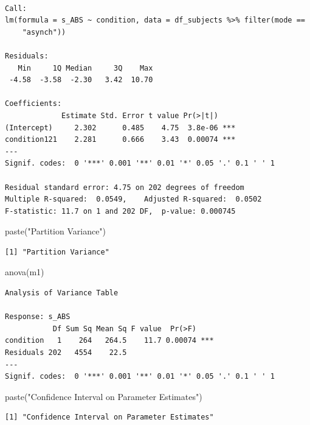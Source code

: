 \documentclass[
  letterpaper,
  DIV=11,
  numbers=noendperiod]{scrreprt}
\newenvironment{Shaded}{\begin{snugshade}}{\end{snugshade}}
\newcommand{\FunctionTok}[1]{\textcolor[rgb]{0.28,0.35,0.67}{#1}}
\newcommand{\NormalTok}[1]{\textcolor[rgb]{0.00,0.23,0.31}{#1}}
\newcommand{\StringTok}[1]{\textcolor[rgb]{0.13,0.47,0.30}{#1}}
\begin{document}
\begin{verbatim}

Call:
lm(formula = s_ABS ~ condition, data = df_subjects %>% filter(mode == 
    "asynch"))

Residuals:
   Min     1Q Median     3Q    Max 
 -4.58  -3.58  -2.30   3.42  10.70 

Coefficients:
             Estimate Std. Error t value Pr(>|t|)    
(Intercept)     2.302      0.485    4.75  3.8e-06 ***
condition121    2.281      0.666    3.43  0.00074 ***
---
Signif. codes:  0 '***' 0.001 '**' 0.01 '*' 0.05 '.' 0.1 ' ' 1

Residual standard error: 4.75 on 202 degrees of freedom
Multiple R-squared:  0.0549,    Adjusted R-squared:  0.0502 
F-statistic: 11.7 on 1 and 202 DF,  p-value: 0.000745
\end{verbatim}

\begin{Shaded}
\begin{Highlighting}[]
\FunctionTok{paste}\NormalTok{(}\StringTok{"Partition Variance"}\NormalTok{)}
\end{Highlighting}
\end{Shaded}

\begin{verbatim}
[1] "Partition Variance"
\end{verbatim}

\begin{Shaded}
\begin{Highlighting}[]
\FunctionTok{anova}\NormalTok{(m1)}
\end{Highlighting}
\end{Shaded}

\begin{verbatim}
Analysis of Variance Table

Response: s_ABS
           Df Sum Sq Mean Sq F value  Pr(>F)    
condition   1    264   264.5    11.7 0.00074 ***
Residuals 202   4554    22.5                    
---
Signif. codes:  0 '***' 0.001 '**' 0.01 '*' 0.05 '.' 0.1 ' ' 1
\end{verbatim}

\begin{Shaded}
\begin{Highlighting}[]
\FunctionTok{paste}\NormalTok{(}\StringTok{"Confidence Interval on Parameter Estimates"}\NormalTok{)}
\end{Highlighting}
\end{Shaded}

\begin{verbatim}
[1] "Confidence Interval on Parameter Estimates"
\end{verbatim}
\end{document}
